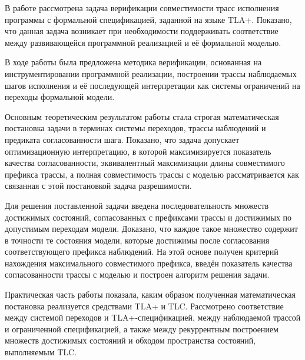 \conclusion

В работе рассмотрена задача верификации совместимости трасс исполнения
программы с формальной спецификацией, заданной на языке TLA+. Показано, что
данная задача возникает при необходимости поддерживать соответствие между
развивающейся программной реализацией и её формальной моделью.

В ходе работы была предложена методика верификации, основанная на
инструментировании программной реализации, построении трассы наблюдаемых шагов
исполнения и её последующей интерпретации как системы ограничений на переходы
формальной модели.

Основным теоретическим результатом работы стала строгая математическая
постановка задачи в терминах системы переходов, трассы наблюдений и предиката
согласованности шага. Показано, что задача допускает оптимизационную
интерпретацию, в которой максимизируется показатель качества согласованности,
эквивалентный максимизации длины совместимого префикса трассы, а полная
совместимость трассы с моделью рассматривается как связанная с этой
постановкой задача разрешимости.

Для решения поставленной задачи введена последовательность множеств достижимых
состояний, согласованных с префиксами трассы и достижимых по допустимым
переходам модели. Доказано, что каждое такое множество содержит в точности те
состояния модели, которые достижимы после согласования соответствующего
префикса наблюдений. На этой основе получен критерий нахождения максимального
совместимого префикса, введён показатель качества согласованности трассы с
моделью и построен алгоритм решения задачи.

Практическая часть работы показала, каким образом полученная математическая
постановка реализуется средствами TLA+ и TLC. Рассмотрено соответствие между
системой переходов и TLA+-спецификацией, между наблюдаемой трассой и
ограниченной спецификацией, а также между рекуррентным построением множеств
достижимых состояний и обходом пространства состояний, выполняемым TLC.
